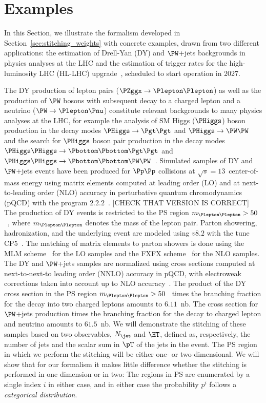 \section{Examples}
\label{sec:examples}

In this Section, we illustrate the formalism developed in Section~\ref{sec:stitching_weights} with concrete examples,
drawn from two different applications: the estimation of Drell-Yan (DY) and $\PW$+jets backgrounds in physics analyses at the LHC
and the estimation of trigger rates for the high-luminosity LHC (HL-LHC) upgrade~\cite{TDR_Phase2_LHC},
scheduled to start operation in 2027.

The DY production of lepton pairs ($\PZggx \to \Plepton\Plepton$) as well as the production of $\PW$ bosons with subsequent decay to a charged lepton and a neutrino ($\PW \to \Plepton\Pnu$)
constitute relevant backgrounds to many physics analyses at the LHC,
for example the analysis of SM Higgs ($\PHiggs$) boson production in the decay modes $\PHiggs \to \Pgt\Pgt$ and $\PHiggs \to \PW\PW$
and the search for $\PHiggs$ boson pair production in the decay modes $\PHiggs\PHiggs \to \Pbottom\Pbottom\Pgt\Pgt$ and 
$\PHiggs\PHiggs \to \Pbottom\Pbottom\PW\PW$~\cite{ATLAS:2014aga,Aad:2015vsa,Aad:2019yxi,Aaboud:2018sfw,CMS-HIG-13-004,CMS-HIG-13-027,CMS-HIG-17-002,CMS-HIG-17-006}.
Simulated samples of DY and $\PW$+jets events have been produced for $\Pp\Pp$ collisions at $\sqrt{s}=13$~\TeV center-of-mass energy
using matrix elements computed at leading order (LO) and at next-to-leading order (NLO) accuracy in perturbative quantum chromodynamics (pQCD)
with the program \MGvATNLO $2.2.2$~\cite{Alwall:2014hca}. [CHECK THAT VERSION IS CORRECT]
The production of DY events is restricted to the PS region $m_{\Plepton\Plepton} > 50$~\GeV, where $m_{\Plepton\Plepton}$ denotes the mass of the lepton pair.
Parton showering, hadronization, and the underlying event are modeled using \PYTHIA $v8.2$ with the tune \textrm{CP5}~\cite{Sirunyan:2019dfx}.
The matching of matrix elements to parton showers is done using the \textrm{MLM} scheme~\cite{Alwall:2007fs} for the LO samples
and the \textrm{FXFX} scheme~\cite{Frederix:2012ps} for the NLO samples.
The DY and $\PW$+jets samples are normalized using cross sections computed at next-to-next-to leading order (NNLO) accuracy in pQCD,
with electroweak corrections taken into account up to NLO accuracy~\cite{Li:2012wna}.
The product of the DY cross section in the PS region $m_{\Plepton\Plepton} > 50$~\GeV
times the branching fraction for the decay into two charged leptons amounts to $6.11$~nb.
The cross section for $\PW$+jets production times the branching fraction for the decay to charged lepton and neutrino amounts to $61.5$~nb.
We will demonstrate the stitching of these samples based on two observables,
$N_{\jet}$ and $\HT$, defined as, respectively, the number of jets and the scalar sum in $\pT$ of the jets in the event.
The PS region in which we perform the stitching will be either one- or two-dimensional.
We will show that for our formalism
it makes little difference whether the stitching is performed in one dimension or in two:
The regions in PS are enumerated by a single index $i$ in either case,
and in either case the probability $p^{i}$ follows a {\em categorical distribution}.

